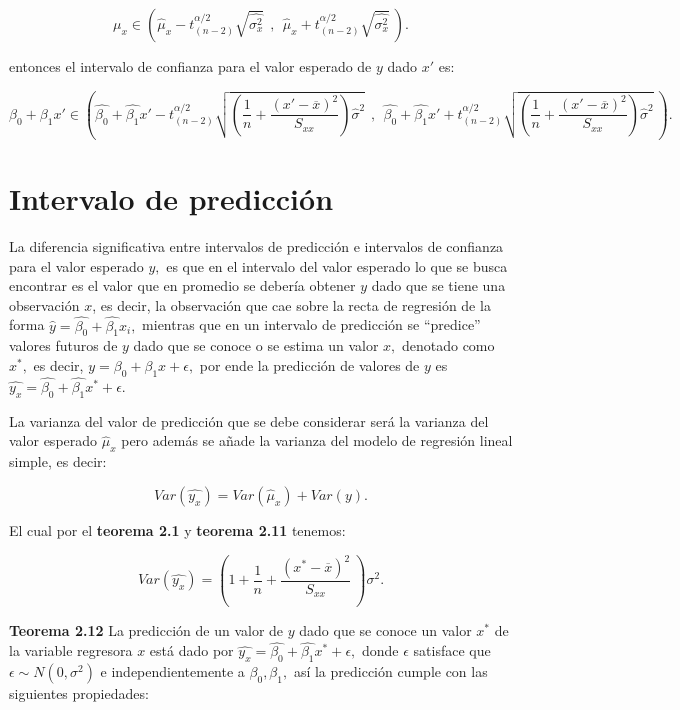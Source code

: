 \documentclass[
  a4paper,
  oneside,
  openany]{book}
\begin{document}
\[\mu_{x} \in \left(\hat{\mu}_{x}-t_{(n-2)}^{\alpha/2}\sqrt{\hat{\sigma_{x}^2}} \ \ , \ \ \hat{\mu}_{x}+t_{(n-2)}^{\alpha/2}\sqrt{\hat{\sigma_{x}^2}} \ \right).\]

entonces el intervalo de confianza para el valor esperado de \(y\) dado \(x'\) es:

\[\beta_{0}+\beta_{1}x' \in \left(\hat{\beta_{0}}+\hat{\beta_{1}}x'-t_{(n-2)}^{\alpha/2}\sqrt{\left( \frac{1}{n}+\frac{(x'-\overline{x})^2}{S_{xx}}\right)\hat{\sigma}^2} \ \ , \ \ \hat{\beta_{0}}+\hat{\beta_{1}}x'+t_{(n-2)}^{\alpha/2}\sqrt{\left( \frac{1}{n}+\frac{(x'-\overline{x})^2}{S_{xx}}\right)\hat{\sigma}^2} \ \right).\]

\hypertarget{intervalo-de-predicciuxf3n}{%
\section{Intervalo de predicción}\label{intervalo-de-predicciuxf3n}}

La diferencia significativa entre intervalos de predicción e intervalos de confianza para el valor esperado \(y,\) es que en el intervalo del valor esperado lo que se busca encontrar es el valor que en promedio se debería obtener \(y\) dado que se tiene una observación \(x\), es decir, la observación que cae sobre la recta de regresión de la forma \(\hat{y}=\hat{\beta_{0}}+\hat{\beta_{1}}x_{i},\) mientras que en un intervalo de predicción se ``predice'' valores futuros de \(y\) dado que se conoce o se estima un valor \(x,\) denotado como \(x^*,\) es decir, \(y=\beta_{0}+\beta_{1}x+\epsilon,\) por ende la predicción de valores de \(y\) es \(\hat{y_{x}}=\hat{\beta_{0}}+\hat{\beta_{1}}x^*+\epsilon\).

La varianza del valor de predicción que se debe considerar será la varianza del valor esperado \(\hat{\mu}_{x}\) pero además se añade la varianza del modelo de regresión lineal simple, es decir:

\[Var(\hat{y_{x}})=Var(\hat{\mu}_x)+Var(y).\]

El cual por el \textbf{teorema 2.1} y \textbf{teorema 2.11} tenemos:

\[Var(\hat{y_{x}})=\left( 1+ \frac{1}{n}+\frac{(x^*-\overline{x})^2}{S_{xx}} \ \right)\sigma^2.\]

\textbf{Teorema 2.12} La predicción de un valor de \(y\) dado que se conoce un valor \(x^*\) de la variable regresora \(x\) está dado por \(\hat{y_{x}}=\hat{\beta_{0}}+\hat{\beta_{1}}x^*+\epsilon,\) donde \(\epsilon\) satisface que \(\epsilon\sim N(0,\sigma^2)\) e independientemente a \(\beta_{0},\beta_{1},\) así la predicción cumple con las siguientes propiedades:
\end{document}
